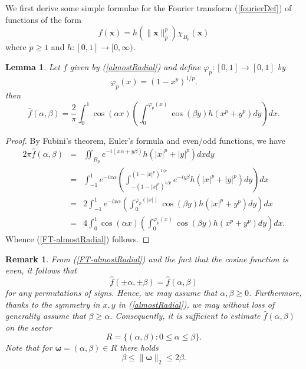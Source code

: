 \documentclass{amsart}
\newtheorem{lem}[theorem]{Lemma}
\newtheorem{rem}[theorem]{Remark}
\numberwithin{equation}{section}
\begin{document}
We first derive some simple formulae for the Fourier transform (\ref{fourierDef}) of functions of the form
\begin{equation}
    \label{almostRadial}
    f(\boldsymbol{x})=h(\|\boldsymbol{x}\|_p^p)\chi_{B_p}(\boldsymbol{x})
\end{equation}
where $p\ge1$ and $h:[0,1]\rightarrow[0,\infty)$.
\begin{lem}
Let $f$ given by (\ref{almostRadial}) and define $\varphi_p:[0,1]\rightarrow[0,1]$ by
\begin{equation}
\label{phi-Function}
\varphi_p(x)=\left(1-x^p\right)^{1/p}.
\end{equation}
then
\begin{equation}
\label{FT-almostRadial}
\widehat{f}(\alpha,\beta)=\frac{2}{\pi}\int_0^1\cos(\alpha x)\left(\int_0^{\varphi_p(x)}\cos(\beta y)h(x^p+y^p)dy\right)dx.
\end{equation}
\end{lem}
\begin{proof}
By Fubini's theorem, Euler's formula and even/odd functions, we have
\begin{eqnarray}
    \nonumber
    2\pi\widehat{f}(\alpha,\beta)&=&\iint_{B_p}e^{-i(x\alpha+y\beta)}h(|x|^p+|y|^p)dxdy\\
    \nonumber
    &=&\int_{-1}^1e^{-ix\alpha}\left(\int_{-(1-|x|^p)^{1/p}}^{(1-|x|^p)^{1/p}}e^{-iy\beta}h(|x|^p+|y|^p)dy\right)dx\\
    \nonumber
    &=&2\int_{-1}^1e^{-ix\alpha}\left(\int_0^{\varphi_p(|x|)}\cos(\beta y)h(|x|^p+y^p)dy\right)dx\\
    \nonumber
    &=&4\int_0^1\cos(\alpha x)\left(\int_0^{\varphi_p(x)}\cos(\beta y)h(x^p+y^p)dy\right)dx.
\end{eqnarray}
Whence (\ref{FT-almostRadial}) follows.
\end{proof}
\begin{rem}
\label{domainRemark}
From (\ref{FT-almostRadial}) and the fact that the cosine function is even,  it follows that
$$
\widehat{f}(\pm\alpha,\pm\beta)=\widehat{f}(\alpha,\beta)
$$
for any permutations of signs. Hence, we may assume that $\alpha,\beta\ge0$.
Furthermore, thanks to the symmetry in $x,y$ in (\ref{almostRadial}), we may without loss of generality assume that $\beta\ge\alpha$.
Consequently, it is sufficient to estimate $\widehat{f}(\alpha,\beta)$ on the sector
\begin{equation}
    \label{domainRest}
    R=\{(\alpha,\beta):0\le\alpha\le\beta\}.
\end{equation}
Note that for $\boldsymbol{\omega}=(\alpha,\beta)\in R$ there holds
\begin{equation}
    \label{domainIneq}
    \beta\le\|\boldsymbol{\omega}\|_2\le2\beta.
\end{equation}
\end{rem}
\end{document}
